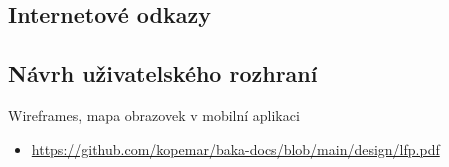 \documentclass[twoside]{ctuthesis}
\begin{document}
\begin{enumerate}[label=\textbf{O\arabic*.}]
%
%

\printbibliography[title={Seznam použité literatury}]

\appendix

%



\chapter{Internetové odkazy}
\section{Návrh uživatelského rozhraní}\label{sec:ui}

Wireframes, mapa obrazovek v mobilní aplikaci
\begin{itemize}
	\item \url{https://github.com/kopemar/baka-docs/blob/main/design/lfp.pdf}
\end{itemize}




\end{enumerate}
\end{document}

